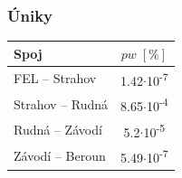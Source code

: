 \documentclass[aspectratio=169, 12pt, hyperref={unicode}]{beamer}
\begin{document}
\begin{frame}
\frametitle{Úniky}
\begin{table}[ht]
		\centering	
		\begin{tabular}[t]{|l||c|}
			\hline
			Spoj & $pw \; [\text{\%}]$\\
			\hline\hline
			FEL -- Strahov & 1.42$\cdot$10\textsuperscript{-7}\\  
			\hline
			Strahov -- Rudná & 8.65$\cdot$10\textsuperscript{-4}\\
			\hline
			Rudná -- Závodí & 5.2$\cdot$10\textsuperscript{-5} \\
			\hline
			Závodí -- Beroun & 5.49$\cdot$10\textsuperscript{-7} \\
			\hline
		\end{tabular}
	\end{table}
\end{frame}

\end{document}
